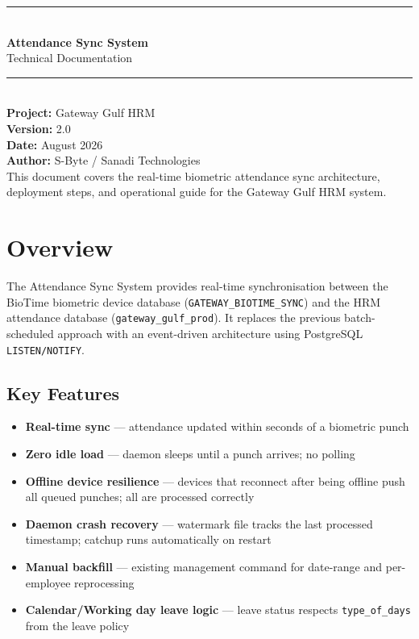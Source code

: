 \documentclass[12pt,a4paper]{article}
\begin{document}
\begin{titlepage}
    \centering
    \vspace*{2cm}
    {\color{primaryblue}\rule{\linewidth}{1.5pt}}\\[0.5cm]
    {\Huge\bfseries\color{primaryblue} Attendance Sync System}\\[0.3cm]
    {\Large\color{codegray} Technical Documentation}\\[0.3cm]
    {\color{primaryblue}\rule{\linewidth}{1.5pt}}\\[1.5cm]
    {\large\textbf{Project:} Gateway Gulf HRM}\\[0.3cm]
    {\large\textbf{Version:} 2.0}\\[0.3cm]
    {\large\textbf{Date:} August 2026}\\[0.3cm]
    {\large\textbf{Author:} S-Byte / Sanadi Technologies}\\[2cm]
    \vfill
    {\color{codegray}\small This document covers the real-time biometric attendance sync
    architecture, deployment steps, and operational guide for the Gateway Gulf HRM system.}
\end{titlepage}

\tableofcontents
\newpage

\section{Overview}

The Attendance Sync System provides real-time synchronisation between the
BioTime biometric device database (\texttt{GATEWAY\_BIOTIME\_SYNC}) and the
HRM attendance database (\texttt{gateway\_gulf\_prod}). It replaces the
previous batch-scheduled approach with an event-driven architecture using
PostgreSQL \texttt{LISTEN/NOTIFY}.

\subsection{Key Features}

\begin{itemize}[leftmargin=2em]
    \item \textbf{Real-time sync} — attendance updated within seconds of a
          biometric punch
    \item \textbf{Zero idle load} — daemon sleeps until a punch arrives;
          no polling
    \item \textbf{Offline device resilience} — devices that reconnect after
          being offline push all queued punches; all are processed correctly
    \item \textbf{Daemon crash recovery} — watermark file tracks the last
          processed timestamp; catchup runs automatically on restart
    \item \textbf{Manual backfill} — existing management command for
          date-range and per-employee reprocessing
    \item \textbf{Calendar/Working day leave logic} — leave status respects
          \texttt{type\_of\_days} from the leave policy
\end{itemize}
\end{document}
